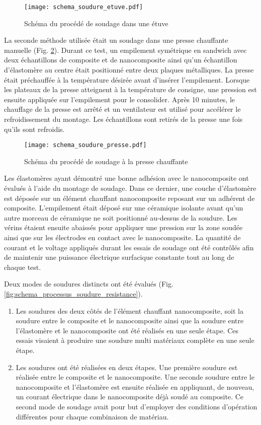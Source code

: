 \begin{figure}[h]
	\centering
	\texttt{[image: schema\_soudure\_etuve.pdf]}
	\caption{Schéma du procédé de soudage dans une étuve}
	\label{fig:schema_soudure_etuve}
\end{figure}

La seconde méthode utilisée était un soudage dans une presse chauffante manuelle (Fig. \ref{fig:schema_soudure_presse}). 
Durant ce test, un empilement symétrique en sandwich avec deux échantillons de composite et de nanocomposite ainsi qu'un échantillon d'élastomère au centre était positionné entre deux plaques métalliques. 
La presse était préchauffée à la température désirée avant d'insérer l'empilement. 
Lorsque les plateaux de la presse atteignent à la température de consigne, une pression est ensuite appliquée sur l'empilement pour le consolider. 
Après 10 minutes, le chauffage de la presse est arrêté et un ventilateur est utilisé pour accélérer le refroidissement du montage. 
Les échantillons sont retirés de la presse une fois qu'ils sont refroidis. 

\begin{figure}[h]
	\centering
	\texttt{[image: schema\_soudure\_presse.pdf]}
	\caption{Schéma du procédé de soudage à la presse chauffante}
	\label{fig:schema_soudure_presse}
\end{figure}


Les élastomères ayant démontré une bonne adhésion avec le nanocomposite ont évalués à l'aide du montage de soudage. 
Dans ce dernier, une couche d'élastomère est déposée sur un élément chauffant nanocomposite reposant sur un adhérent de composite. 
L'empilement était déposé sur une céramique isolante avant qu'un autre morceau de céramique ne soit positionné au-dessus de la soudure. 
Les vérins étaient ensuite abaissés pour appliquer une pression sur la zone soudée ainsi que sur les électrodes en contact avec le nanocomposite. 
La quantité de courant et le voltage appliqués durant les essais de soudage ont été contrôlés afin de maintenir une puissance électrique surfacique constante tout au long de chaque test. 

Deux modes de soudures distincts ont été évalués (Fig. \ref{fig:schema_processus_soudure_resistance}). 
\begin{enumerate}
	\item Les soudures des deux côtés de l'élément chauffant nanocomposite, soit la soudure entre le composite et le nanocomposite ainsi que la soudure entre l'élastomère et le nanocomposite ont été réalisés en une seule étape. 
	Ces essais visaient à produire une soudure multi matériaux complète en une seule étape. 
	\item Les soudures ont été réalisées en deux étapes. 
	Une première soudure est réalisée entre le composite et le nanocomposite. 
	Une seconde soudure entre le nanocomposite et l'élastomère est ensuite réalisée en appliquant, de nouveau, un courant électrique dans le nanocomposite déjà soudé au composite. 
	Ce second mode de soudage avait pour but d'employer des conditions d'opération différentes pour chaque combinaison de matériau. 
\end{enumerate}

